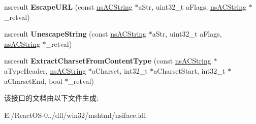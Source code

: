 \begin{DoxyCompactItemize}
\item 
\mbox{\label{interfacens_i_net_util_a5cfc89fd1a9af1581f30d462d235b93a}} 
nsresult {\bfseries Escape\+U\+RL} (const \hyperlink{structns_c_string_container}{ns\+A\+C\+String} $\ast$a\+Str, uint32\+\_\+t a\+Flags, \hyperlink{structns_c_string_container}{ns\+A\+C\+String} $\ast$\+\_\+retval)
\item 
\mbox{\label{interfacens_i_net_util_aae18f3189cc2ca5fa3d79a2af497abfb}} 
nsresult {\bfseries Unescape\+String} (const \hyperlink{structns_c_string_container}{ns\+A\+C\+String} $\ast$a\+Str, uint32\+\_\+t a\+Flags, \hyperlink{structns_c_string_container}{ns\+A\+C\+String} $\ast$\+\_\+retval)
\item 
\mbox{\label{interfacens_i_net_util_a3e7c36ce93c0d6e84a6f023d3bdcae85}} 
nsresult {\bfseries Extract\+Charset\+From\+Content\+Type} (const \hyperlink{structns_c_string_container}{ns\+A\+C\+String} $\ast$a\+Type\+Header, \hyperlink{structns_c_string_container}{ns\+A\+C\+String} $\ast$a\+Charset, int32\+\_\+t $\ast$a\+Charset\+Start, int32\+\_\+t $\ast$a\+Charset\+End, bool $\ast$\+\_\+retval)
\end{DoxyCompactItemize}


该接口的文档由以下文件生成\+:\begin{DoxyCompactItemize}
\item 
E\+:/\+React\+O\+S-\/0../dll/win32/mshtml/nsiface.\+idl\end{DoxyCompactItemize}
